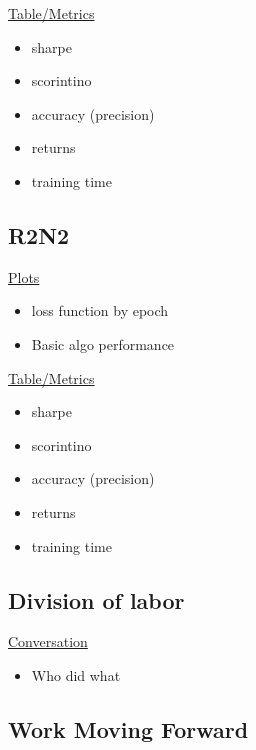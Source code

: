 \documentclass{article}
\begin{document}
\underline{Table/Metrics}
\begin{itemize}
\item sharpe
\item scorintino
\item accuracy (precision)
\item returns
\item training time
\end{itemize}


\subsection{R2N2}


\underline{Plots}
\begin{itemize}
\item loss function by epoch
\item Basic algo performance 
\end{itemize}

\underline{Table/Metrics}
\begin{itemize}
\item sharpe
\item scorintino
\item accuracy (precision)
\item returns
\item training time
\end{itemize}


\subsection{Division of labor}

\underline{Conversation}
\begin{itemize}
\item Who did what
\end{itemize}

\subsection{Work Moving Forward}
\end{document}
